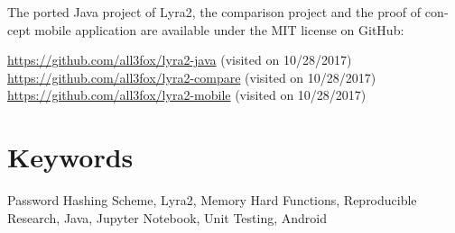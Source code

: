 \begin{otherlanguage}{english}
The ported Java project of Lyra2, the comparison project and the proof of concept mobile application are available under the MIT license on GitHub:

\url{https://github.com/all3fox/lyra2-java} (visited on 10/28/2017)\\
\url{https://github.com/all3fox/lyra2-compare} (visited on 10/28/2017)\\
\url{https://github.com/all3fox/lyra2-mobile} (visited on 10/28/2017)

\bigskip

\section*{Keywords}
Password Hashing Scheme, Lyra2, Memory Hard Functions, Reproducible Research, Java, Jupyter Notebook, Unit Testing, Android

\end{otherlanguage}
